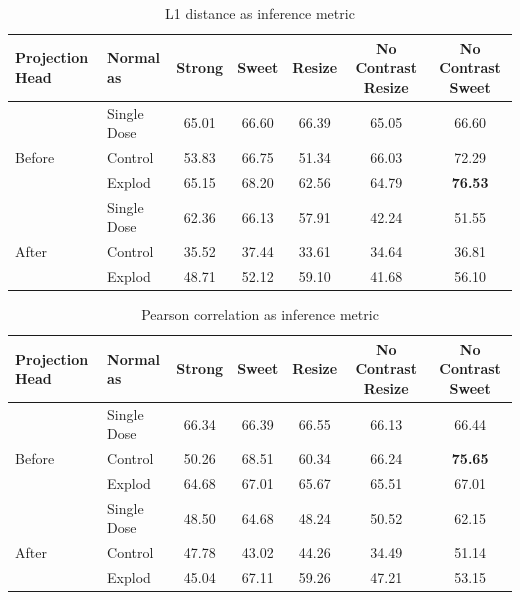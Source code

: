 \begin{table}[H]
  \centering
  \begin{tabular}{@{}llccccc@{}}
  \toprule
  Projection Head & Normal as       & Strong & Sweet & Resize & No Contrast Resize & No Contrast Sweet \\ \midrule
                  & Single Dose    & 65.01      & 66.60     & 66.39      & 65.05                  & 66.60                 \\
  Before          & Control        & 53.83      & 66.75     &  51.34     & 66.03                  & 72.29                 \\
                  & Explod         & 65.15      & 68.20     & 62.56      & 64.79                  & \textbf{76.53}                 \\ \midrule
                  & Single Dose    & 62.36      & 66.13     & 57.91      & 42.24                  & 51.55                 \\
  After           & Control        & 35.52      & 37.44     & 33.61      & 34.64                  & 36.81                 \\
                  & Explod         & 48.71      & 52.12     & 59.10      & 41.68                  & 56.10                 \\ \bottomrule
  \end{tabular}
  \caption{L1 distance as inference metric}
  \label{tab:table_l}
\end{table}

\begin{table}[H]
  \centering
  \begin{tabular}{@{}llccccc@{}}
  \toprule
  Projection Head & Normal as       & Strong & Sweet & Resize & No Contrast Resize & No Contrast Sweet \\ \midrule
                  & Single Dose    & 66.34      & 66.39     & 66.55      & 66.13                  & 66.44                 \\
  Before          & Control        & 50.26      & 68.51     & 60.34      & 66.24                  & \textbf{75.65}                 \\
                  & Explod         & 64.68      & 67.01     & 65.67      & 65.51                  & 67.01                 \\ \midrule
                  & Single Dose    & 48.50      & 64.68     & 48.24      & 50.52                  & 62.15                 \\
  After           & Control        & 47.78      & 43.02     & 44.26      & 34.49                  & 51.14                 \\
                  & Explod         & 45.04      & 67.11     & 59.26      & 47.21                  & 53.15                 \\ \bottomrule
  \end{tabular}
  \caption{Pearson correlation as inference metric}
  \label{tab:table_pear}
\end{table}


